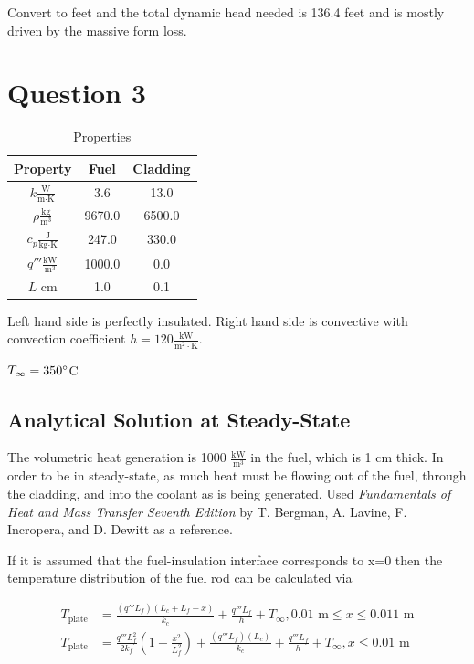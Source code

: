 \documentclass{article}
\begin{document}
Convert to feet and the total dynamic head needed is 136.4 feet and is mostly driven by the massive form loss.

\newpage

\section{Question 3}

\begin{table}[htbp]
    \centering
    \begin{tabular}{|c|c|c|}
    \hline
    Property & Fuel & Cladding \\ \hline
    $k \frac{\text{W}}{\text{m} \cdot \text{K}}$ & 3.6 & 13.0 \\ \hline
    $\rho \frac{\text{kg}}{\text{m}^3}$ & 9670.0 & 6500.0 \\ \hline
    $c_p \frac{\text{J}}{\text{kg} \cdot \text{K}}$ & 247.0 & 330.0 \\ \hline
    $q''' \frac{\text{kW}}{\text{m}^3}$ & 1000.0 & 0.0 \\ \hline
    $L$ cm & 1.0 & 0.1 \\ \hline
    \end{tabular}
    \caption{Properties}
    \label{tab:q3_properties}
\end{table}

Left hand side is perfectly insulated. Right hand side is convective with convection coefficient $h = 120 \frac{\text{kW}}{\text{m}^2 \cdot \text{K}}$.

$T_{\infty} = 350 \degree$C 

\subsection{Analytical Solution at Steady-State}

The volumetric heat generation is 1000 $\frac{\text{kW}}{\text{m}^3}$ in the fuel, which is 1 cm thick. In order to be in steady-state, as much heat must be flowing out of the fuel, through the cladding, and into the coolant as is being generated. Used \textit{Fundamentals of Heat and Mass Transfer Seventh Edition} by T. Bergman, A. Lavine, F. Incropera, and D. Dewitt as a reference.

If it is assumed that the fuel-insulation interface corresponds to x=0 then the temperature distribution of the fuel rod can be calculated via

\begin{align}
    T_{\text{plate}} &= \frac{(q''' L_f)(L_c + L_f - x)}{k_c} + \frac{q''' L_f}{h} + T_{\infty}, 0.01 \text{ m} \leq x \leq 0.011 \text{ m} \\
    T_{\text{plate}} &= \frac{q''' L_f^2}{2 k_f}(1 - \frac{x^2}{L_f^2}) + \frac{(q''' L_f)(L_c)}{k_c} + \frac{q''' L_f}{h} + T_{\infty}, x \leq 0.01 \text{ m}
\end{align}
\end{document}
